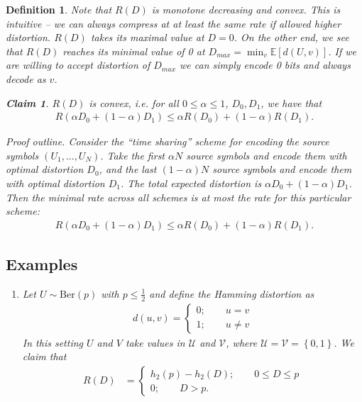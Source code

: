 \documentclass[12pt]{extarticle}
\newtheorem*{definition}{Definition}
\newtheorem*{claim}{Claim}
\newcommand{\EE}{\mathbb{E}}
\newcommand{\UU}{\mathcal{U}}
\def\Ber{\text{Ber}}
\def\UU{\mathcal{U}}
\def\VV{\mathcal{V}}
\begin{document}
\begin{definition}
Note that $R(D)$ is monotone decreasing and convex.  This is intuitive -- we can always compress at at least the same rate if allowed higher distortion.  $R(D)$ takes its maximal value at $D = 0$.  On the other end, we see that $R(D)$ reaches its minimal value of 0 at $D_{max} = \min_v \EE[d(U,v)]$.  If we are willing to accept distortion of $D_{max}$ we can simply encode 0 bits and always decode as $v$.  

\begin{claim}
  $R(D)$ is convex, i.e. for all $0 \leq \alpha \leq 1$, $D_0, D_1$, we have that
  \begin{align*}
    R(\alpha D_0 + (1 - \alpha) D_1) \leq \alpha R (D_0) + (1 - \alpha) R(D_1).
  \end{align*}
\end{claim}

{\it Proof outline.}  Consider the ``time sharing'' scheme for encoding the source symbols $(U_1, \dots, U_N)$.  Take the first $\alpha N$ source symbols and encode them with optimal distortion $D_0$, and the last $(1 - \alpha) N$ source symbols and encode them with optimal distortion $D_1$.  The total expected distortion is $\alpha  D_0 + (1 - \alpha)  D_1$.  Then the minimal rate across all schemes is at most the rate for this particular scheme:
\begin{align*}
  R(\alpha D_0 + (1 - \alpha)D_1) \leq \alpha R(D_0) + (1 - \alpha) R(D_1).
\end{align*}

\subsection{Examples}

\begin{enumerate}
  \item Let $U \sim \Ber(p)$ with $p \leq \frac{1}{2}$ and define the Hamming distortion as
    \begin{align*}
      d(u, v) = 
      \begin{cases}
        0; \qquad u = v \\
        1; \qquad u \neq v
      \end{cases}
    \end{align*}
    In this setting $U$ and $V$ take values in $\UU$ and $\VV$, where $\UU = \VV = \left\{ 0, 1 \right\}$. We claim that
    \begin{align*}
      R(D) &=
      \begin{cases}
        h_2(p) - h_2(D); \qquad 0 \leq D \leq p \\
        0; \qquad D > p.
      \end{cases}
    \end{align*}


\end{enumerate}
\end{definition}
\end{document}
